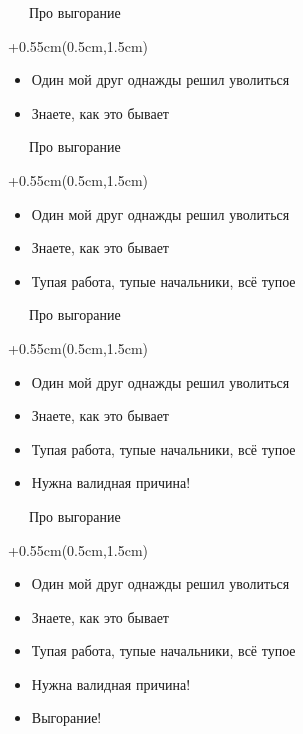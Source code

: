 \documentclass[xetex,18pt,aspectratio=169]{beamer}
\begin{document}
\begin{Large}
\begin{frame}{\ \ \ Про выгорание}
\begin{textblock*}{\framewidth+0.55cm}(0.5cm,1.5cm)
\begin{itemize}
  \item Один мой друг однажды решил уволиться
  \item Знаете, как это бывает
\end{itemize}
\end{textblock*}
\end{frame}

\begin{frame}{\ \ \ Про выгорание}
\begin{textblock*}{\framewidth+0.55cm}(0.5cm,1.5cm)
\begin{itemize}
  \item Один мой друг однажды решил уволиться
  \item Знаете, как это бывает
  \item Тупая работа, тупые начальники, всё тупое
\end{itemize}
\end{textblock*}
\end{frame}

\begin{frame}{\ \ \ Про выгорание}
\begin{textblock*}{\framewidth+0.55cm}(0.5cm,1.5cm)
\begin{itemize}
  \item Один мой друг однажды решил уволиться
  \item Знаете, как это бывает
  \item Тупая работа, тупые начальники, всё тупое
  \item Нужна валидная причина!
\end{itemize}
\end{textblock*}
\end{frame}

\begin{frame}{\ \ \ Про выгорание}
\begin{textblock*}{\framewidth+0.55cm}(0.5cm,1.5cm)
\begin{itemize}
  \item Один мой друг однажды решил уволиться
  \item Знаете, как это бывает
  \item Тупая работа, тупые начальники, всё тупое
  \item Нужна валидная причина!
  \item Выгорание!
\end{itemize}
\end{textblock*}
\end{frame}


\end{Large}
\end{document}
